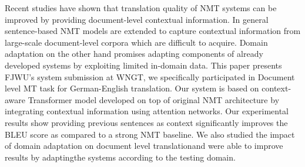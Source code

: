Recent studies  have  shown  that  translation quality of NMT systems can be improved by providing document-level contextual information.   In  general  sentence-based  NMT  models  are  extended  to  capture  contextual  information  from  large-scale  document-level  corpora  which  are  difficult  to  acquire.   Domain adaptation  on  the  other  hand  promises  adapting components of already developed systems by  exploiting  limited  in-domain  data.    This paper presents FJWU's system submission at WNGT, we specifically participated in Document level MT task for German-English translation.  Our system is based on context-aware Transformer model developed on top of original NMT architecture by integrating contextual information using attention networks. Our experimental results show providing previous sentences as context significantly improves the BLEU  score  as  compared  to  a  strong  NMT baseline.   We  also  studied  the  impact  of  domain adaptation on document level translationand were able to improve results by adaptingthe systems according to the testing domain.
